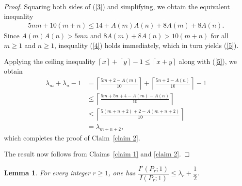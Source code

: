 \documentclass[12pt,twoside]{amsart}
\newtheorem{lemma}[thm]{Lemma}
\theoremstyle{definition}
\theoremstyle{mystyle}
\newcommand{\ceil}[1]{ \left \lceil #1 \right \rceil}
\begin{document}
\begin{proof}
		Squaring both sides of (\ref{3}) and simplifying, we obtain the equivalent inequality
        \begin{align}
            5mn + 10(m+n)\leq 14 + A(m)A(n) + 8A(m) + 8A(n). \label{4}
        \end{align}
        Since $A(m)A(n) > 5mn$ and $8A(m)+ 8A(n)> 10(m+n)$ for all $m\geq 1$ and $n\geq 1$, inequality (\ref{4}) holds immediately, which in turn yields (\ref{5}). 


        Applying the ceiling inequality $\ceil{x}+\ceil{y}-1\leq \ceil{x+y}$ along with (\ref{5}), we obtain
		\begin{align*}
			\lambda_m+\lambda_n-1&= \ceil{\frac{5m+2-A(m)}{10}}+\ceil{\frac{5n+2-A(n)}{10}}-1\\
			&\leq \ceil{\frac{5m+5n+4-A(m)-A(n)}{10}}\\
			&\leq \ceil{\frac{5(m+n+2)+2-A(m+n+2)}{10}} \\
			&=\lambda_{m+n+2},
		\end{align*}
        which completes the proof of Claim~\ref{claim 2}.

The result now follows from Claims~\ref{claim 1} and \ref{claim 2}.
\end{proof}

\begin{lemma}\label{lem:path_mean_mode}
For every integer $r\geq 1$, one has
$\dfrac{I'(P_r;1)}{I(P_r;1)}\leq \lambda_r+\dfrac12$.
\end{lemma}
\end{document}
